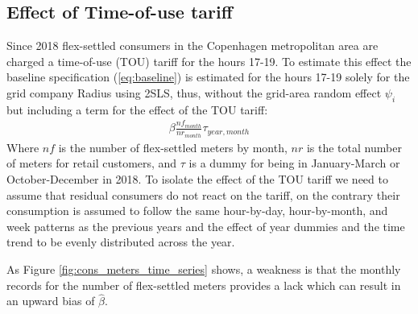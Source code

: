 \subsection{Effect of Time-of-use tariff}
\label{subsec:e_tout}
Since 2018 flex-settled consumers in the Copenhagen metropolitan area are charged a time-of-use (TOU) tariff for the hours 17-19. To estimate this effect the baseline specification (\ref{eq:baseline}) is estimated for the hours 17-19 solely for the grid company Radius using 2SLS, thus, without the grid-area random effect $\psi_i$ but including a term for the effect of the TOU tariff:
\begin{align}
  \beta\frac{nf_{month}}{nr_{month}}\tau_{year,month}
  \label{eq:tout}
\end{align}
Where $nf$ is the number of flex-settled meters by month, $nr$ is the total number of meters for retail customers, and $\tau$ is a dummy for being in January-March or October-December in 2018. To isolate the effect of the TOU tariff we need to assume that residual consumers do not react on the tariff, on the contrary their consumption is assumed to follow the same hour-by-day, hour-by-month, and week patterns as the previous years and the effect of year dummies and the time trend to be evenly distributed across the year.
\par
As Figure \ref{fig:cons_meters_time_series} shows, a weakness is that the monthly records for the number of flex-settled meters provides a lack which can result in an upward bias of $\hat{\beta}$.


